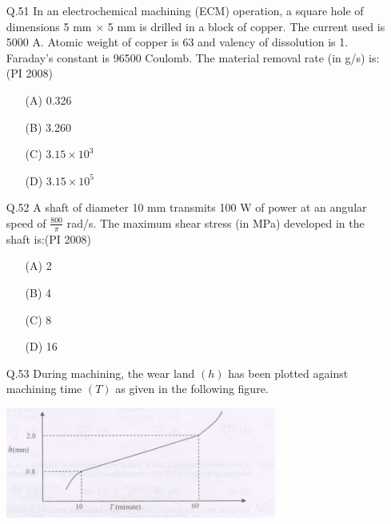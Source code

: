 \documentclass[journal,12pt,onecolumn]{IEEEtran}
\theoremstyle{remark}
\begin{document}
\begin{enumerate}
\item[\textnormal{Q.51}]In an electrochemical machining (ECM) operation, a square hole of dimensions 5 mm $\times$ 5 mm is drilled in a block of copper. The current used is 5000 A. Atomic weight of copper is 63 and valency of dissolution is 1. Faraday's constant is 96500 Coulomb. The material removal rate (in g/s) is:\hfill{(PI 2008)}
\begin{multicols}{4}
    \begin{enumerate}[label=(\Alph*)]
  \item[(A)] 0.326
  \item[(B)] 3.260
  \item[(C)] \( 3.15 \times 10^3 \)
  \item[(D)] \( 3.15 \times 10^5 \)
\end{enumerate}
\end{multicols}
\vspace{1cm}

\item[\textnormal{Q.52}] A shaft of diameter 10 mm transmits 100 W of power at an angular speed of \( \frac{800}{\pi} \) rad/s. The maximum shear stress (in MPa) developed in the shaft is:\hfill{(PI 2008)}
\begin{multicols}{4}
    \begin{enumerate}[label=(\Alph*)]
  \item[(A)] 2
  \item[(B)] 4
  \item[(C)] 8
  \item[(D)] 16
\end{enumerate}
\end{multicols}
\vspace{1cm}
\item[\textnormal{Q.53}]
During machining, the wear land $(h)$ has been plotted against machining time $(T)$ as given in the following figure. \\[2mm]

\begin{center}
\includegraphics[width=0.7\textwidth]{figures/GATE-pi-2008-51.png}
\end{center}


\end{enumerate}
\end{document}
